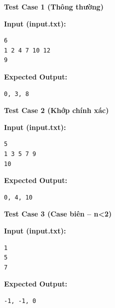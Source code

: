 \textbf{Test Case 1 (Thông thường)}

\textbf{Input (input.txt):}
\begin{lstlisting}
6
1 2 4 7 10 12
9
\end{lstlisting}

\textbf{Expected Output:}
\begin{lstlisting}
0, 3, 8
\end{lstlisting}

\vspace{0.5cm}

\textbf{Test Case 2 (Khớp chính xác)}

\textbf{Input (input.txt):}
\begin{lstlisting}
5
1 3 5 7 9
10
\end{lstlisting}

\textbf{Expected Output:}
\begin{lstlisting}
0, 4, 10
\end{lstlisting}

\vspace{0.5cm}

\textbf{Test Case 3 (Case biên -- n<2)}

\textbf{Input (input.txt):}
\begin{lstlisting}
1
5
7
\end{lstlisting}

\textbf{Expected Output:}
\begin{lstlisting}
-1, -1, 0
\end{lstlisting}